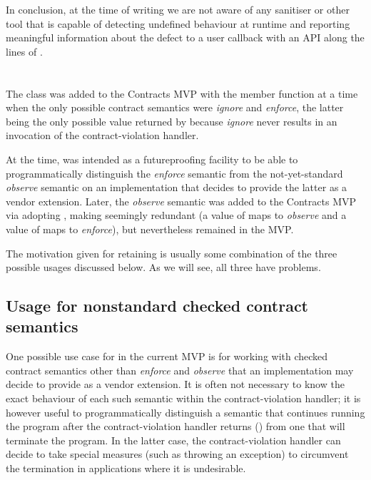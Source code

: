 In conclusion, at the time of writing we are not aware of any sanitiser or other tool that is capable of detecting undefined behaviour at runtime and reporting meaningful information about the defect to a user callback with an API along the lines of \mbox{}.

\section{}

The class \mbox{} was added to the Contracts MVP with the member function  at a time when the only possible contract semantics were \emph{ignore} and \emph{enforce}, the latter being the only possible value returned by  because \emph{ignore} never results in an invocation of the contract-violation handler.

At the time,  was intended as a futureproofing facility to be able to programmatically distinguish the \emph{enforce} semantic from the not-yet-standard \emph{observe} semantic on an implementation that decides to provide the latter as a vendor extension. Later, the \emph{observe} semantic was added to the Contracts MVP via adopting \cite{P2877R0}, making  seemingly redundant (a value of  maps to \emph{observe} and a value of  maps to \emph{enforce}), but nevertheless  remained in the MVP. 

The motivation given for retaining  is usually some combination of the three possible usages discussed below. As we will see, all three have problems.

\subsection{Usage for nonstandard checked contract semantics}

One possible use case for  in the current MVP is for working with checked contract semantics other than \emph{enforce} and \emph{observe} that an implementation may decide to provide as a vendor extension. It is often not necessary to know the exact behaviour of each such semantic within the contract-violation handler; it is however useful to programmatically distinguish a semantic that continues running the program after the contract-violation handler returns () from one that will terminate the program. In the latter case, the contract-violation handler can decide to take special measures (such as throwing an exception) to circumvent the termination in applications where it is undesirable.

